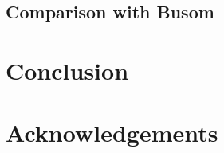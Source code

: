 \documentclass{article}
\begin{document}
   \subsection{Comparison with Busom}
   \section{Conclusion}
   
   \section{Acknowledgements}
   
   
   
\end{document}
